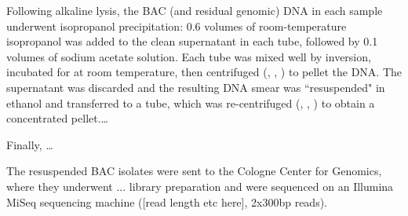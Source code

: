 Following alkaline lysis, the BAC (and residual genomic) DNA in each sample underwent isopropanol precipitation: 0.6 volumes of room-temperature isopropanol was added to the clean supernatant in each tube, followed by 0.1 volumes of  sodium acetate solution. Each tube was mixed well by inversion, incubated for  at room temperature, then centrifuged (, , ) to pellet the DNA. The supernatant was discarded and the resulting DNA smear was ``resuspended" in   ethanol and transferred to a  tube, which was re-centrifuged (, , ) to obtain a concentrated pellet.\dots %

Finally, \dots %


The resuspended BAC isolates were sent to the Cologne Center for Genomics, where they underwent ... library preparation and were sequenced on an Illumina MiSeq sequencing machine ([read length etc here], 2x300bp reads).

